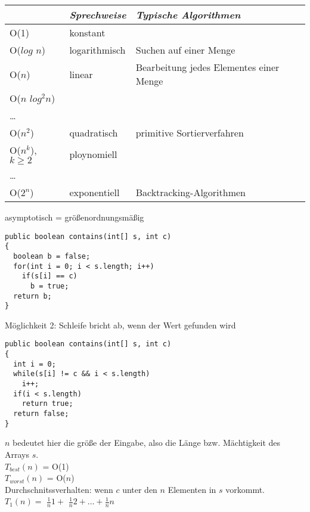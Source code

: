 \documentclass[12pt, twoside]{article}
\begin{document}
\begin{tabular}{|l|l|l|}
\hline
                  & \textit{Sprechweise} & \textit{Typische Algorithmen}    \\
\hline
O(1)              & konstant      &                                         \\
O($log$ $n$)      & logarithmisch & Suchen auf einer Menge                  \\
O($n$)            & linear        & Bearbeitung jedes Elementes einer Menge \\
O($n$ $log^2n$)   &               &                                         \\
\dots             &               &                            \\
O($n^2$)          & quadratisch   & primitive Sortierverfahren \\
O($n^k$), $k\ge2$ & ploynomiell   &                            \\
\dots             &               &                            \\
O($2^n$)          & exponentiell  & Backtracking-Algorithmen   \\
\hline
\end{tabular}

asymptotisch = größenordnungsmäßig\\

\newpage
\begin{lstlisting}[frame=single]
public boolean contains(int[] s, int c)
{
  boolean b = false;
  for(int i = 0; i < s.length; i++)
    if(s[i] == c)
      b = true;
  return b;
}
\end{lstlisting}

Möglichkeit 2: {\tiny Schleife bricht ab, wenn der Wert gefunden wird}

\begin{lstlisting}[frame=single]
public boolean contains(int[] s, int c)
{
  int i = 0;
  while(s[i] != c && i < s.length)
    i++;
  if(i < s.length)
    return true;
  return false;
}
\end{lstlisting}
$n$ bedeutet hier die größe der Eingabe, also die Länge bzw. Mächtigkeit des Arrays $s$.\\
$T_{best}(n)$ = O(1)\\
$T_{worst}(n)$ = O($n$)\\

Durchschnitssverhalten:
wenn $c$ unter den $n$ Elementen in $s$ vorkommt.
$T_1(n)=$  $\frac{1}{n}1+$ $\frac{1}{n}2+ \dots + \frac{1}{n}n$ 
\end{document}
